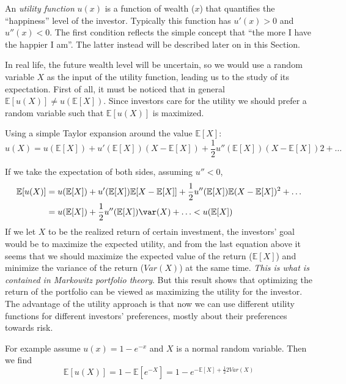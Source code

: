 An \emph{utility function} $u(x)$ is a function of wealth ($x$) that quantifies the ``happiness'' level of the investor. Typically this function has $u'(x) > 0$ and $u''(x) < 0$. The first condition reflects the simple concept that ``the more I have the happier I am''. The latter instead will be described later on in this Section.

In real life, the future wealth level will be uncertain, so we would use a random variable $X$ as the input of the utility function, leading us to the study of its expectation. First of all, it must be noticed that in general $\mathbb{E}[u(X)] \neq u(\mathbb{E}[X])$.
Since investors care for the utility we should prefer a random variable such that $\mathbb{E}[u(X)]$ is maximized.

Using a simple Taylor expansion around the value $\mathbb{E}[X]$:
\begin{equation*}
u(X) = u (\mathbb{E}[X]) + u'(\mathbb{E}[X]) (X - \mathbb{E}[X]) + \frac{1}{2}u''(\mathbb{E}[X]) (X - \mathbb{E}[X])2 + \ldots
\end{equation*}

If we take the expectation of both sides, assuming $u'' < 0$,
\begin{equation*}
  \begin{aligned}
  \mathbb{E}[u(X)] &= u(\mathbb{E}[X]) + u'(\mathbb{E}[X]) \mathbb{E}[X-\mathbb{E}[X]] + \frac{1}{2}u''(\mathbb{E}[X]) \mathbb{E}(X-\mathbb{E}[X])^2 + \ldots\\
  &= u (\mathbb{E}[X]) + \frac{1}{2}u'' (\mathbb{E}[X]) \var(X) + \ldots < u (\mathbb{E}[X])
  \end{aligned}
\end{equation*}
If we let $X$ to be the realized return of certain investment, the investors’ goal would be to maximize the expected utility, and from the last equation above it seems
that we should maximize the expected value of the return ($\mathbb{E}[X]$) and minimize the variance of the return ($Var(X)$) at the same time. \emph{This is what is contained in Markowitz portfolio theory}.
But this result shows that optimizing the return of the portfolio can be viewed as maximizing the utility for the investor. The
advantage of the utility approach is that now we can use different utility functions for different investors’ preferences, mostly about their preferences towards risk.

For example assume $u(x) = 1-e^{-x}$ and $X$ is a normal random variable. Then we find
\begin{equation*}
  \mathbb{E}[u(X)] = 1-\mathbb{E}[e^{-X}] = 1-e^{-\mathbb{E}[X]+ \frac{1}{2}2Var(X)}
\end{equation*}

